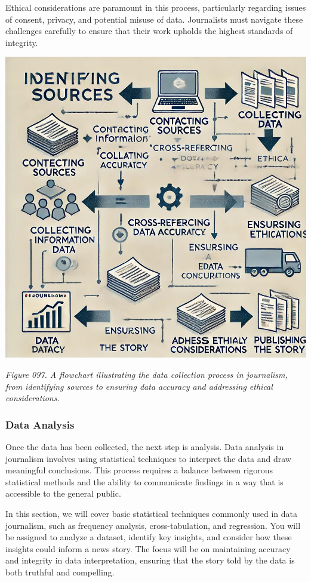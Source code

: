 \documentclass[
]{book}
\begin{document}
Ethical considerations are paramount in this process, particularly regarding issues of consent, privacy, and potential misuse of data. Journalists must navigate these challenges carefully to ensure that their work upholds the highest standards of integrity.

\includegraphics[width=1\linewidth,height=\textheight,keepaspectratio]{images/fig097.jpg}

\emph{Figure 097. A flowchart illustrating the data collection process in journalism, from identifying sources to ensuring data accuracy and addressing ethical considerations.}

\subsubsection{Data Analysis}\label{data-analysis}

Once the data has been collected, the next step is analysis. Data analysis in journalism involves using statistical techniques to interpret the data and draw meaningful conclusions. This process requires a balance between rigorous statistical methods and the ability to communicate findings in a way that is accessible to the general public.

In this section, we will cover basic statistical techniques commonly used in data journalism, such as frequency analysis, cross-tabulation, and regression. You will be assigned to analyze a dataset, identify key insights, and consider how these insights could inform a news story. The focus will be on maintaining accuracy and integrity in data interpretation, ensuring that the story told by the data is both truthful and compelling.
\end{document}
